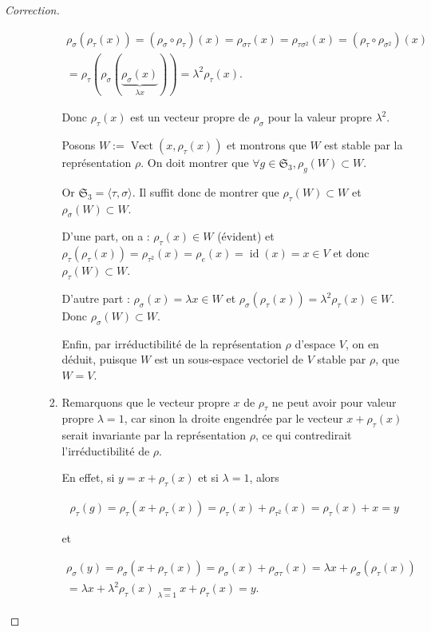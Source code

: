 \documentclass[french]{book}
\theoremstyle{definition}
\theoremstyle{remark}
\begin{document}
\begin{proof}[Correction]
\begin{enumerate}
\begin{enumerate}
\begin{enumerate}
        \begin{gather*}
          \rho _{\sigma}(\rho _{\tau}(x)) = (\rho _{\sigma} \circ \rho _{\tau})(x) = \rho _{\sigma \tau}(x) = \rho _{\tau \sigma ^2}(x) = (\rho _{\tau} \circ \rho _{\sigma ^2})(x) \\
          = \rho _{\tau}(\rho _{\sigma}( \underbrace{\rho _{\sigma}(x)}_{\lambda x})) = \lambda ^2 \rho _{\tau}(x).
        \end{gather*}

        Donc \(\rho _{\tau}(x)\) est un vecteur propre de \(\rho _{\sigma}\) pour la valeur propre \(\lambda ^2\).

        Posons \(W := \operatorname{Vect}(x, \rho _{\tau}(x))\) et montrons que \(W\) est stable par la représentation \(\rho\). On doit montrer que \(\forall g \in \mathfrak{S}_{3}, \rho _{g}(W) \subset W\).

        Or \(\mathfrak{S}_{3} = \langle \tau, \sigma \rangle\). Il suffit donc de montrer que \(\rho _{\tau}(W) \subset W\) et \(\rho _{\sigma}(W) \subset W\).

        D'une part, on a : \(\rho _{\tau}(x) \in W\) (évident) et \(\rho _{\tau}(\rho _{\tau}(x)) = \rho _{\tau ^2}(x) = \rho _{e}(x) = \operatorname{id}(x) =x \in V\) et donc \(\rho _{\tau}(W) \subset W\).

        D'autre part : \(\rho _{\sigma}(x) = \lambda x \in W\) et \(\rho _{\sigma}(\rho _{\tau}(x)) = \lambda ^2 \rho _{\tau}(x)\in W\). Donc \(\rho _{\sigma}(W) \subset W\).

        Enfin, par irréductibilité de la représentation \(\rho\) d'espace \(V\), on en déduit, puisque \(W\) est un sous-espace vectoriel de \(V\) stable par \(\rho\), que \(W = V\).
        \item Remarquons que le vecteur propre \(x\) de \(\rho _{\tau}\) ne peut avoir pour valeur propre \(\lambda = 1\), car sinon la droite engendrée par le vecteur \(x+ \rho _{\tau}(x)\) serait invariante par la représentation \(\rho\), ce qui contredirait l'irréductibilité de \(\rho\).

        En effet, si \(y = x+ \rho _{\tau}(x)\) et si \(\lambda = 1\), alors

        \begin{gather*}
          \rho _{\tau}(g) = \rho _{\tau}(x+ \rho _{\tau}(x)) = \rho _{\tau}(x)+ \rho _{\tau ^2}(x) = \rho _{\tau}(x)+x=y
        \end{gather*}

        et

        \begin{gather*}
          \rho _{\sigma}(y) = \rho _{\sigma}(x+ \rho _{\tau}(x)) = \rho _{\sigma}(x) + \rho _{\sigma \tau}(x) = \lambda x + \rho _{\sigma}(\rho _{\tau}(x)) \\
          = \lambda x + \lambda ^2 \rho _{\tau}(x) \underset{\lambda=1}{=} x + \rho _{\tau}(x) = y.
        \end{gather*}


\end{enumerate}
\end{enumerate}
\end{enumerate}
\end{proof}
\end{document}
